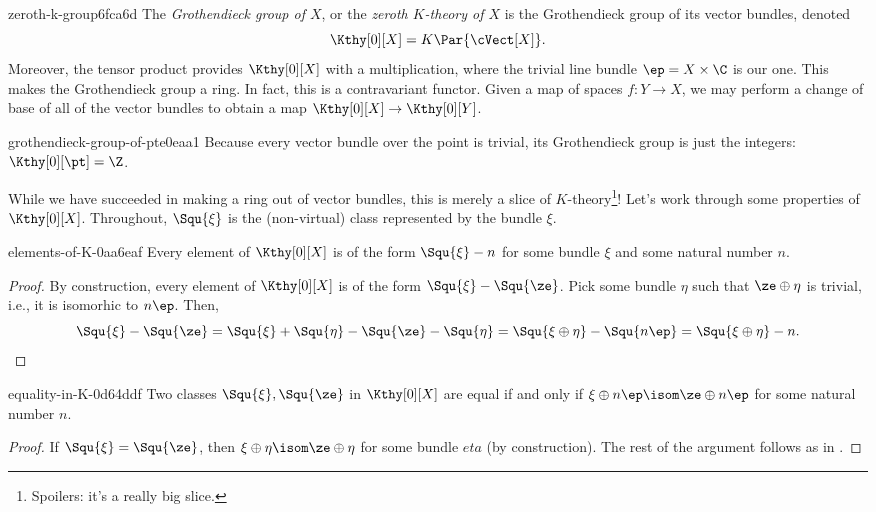 \begin{defn}{zeroth-k-group}{6fca6d}
  The \emph{Grothendieck group of $X$}, or the \emph{zeroth $K$-theory of $X$} is the
  Grothendieck group of its vector bundles, denoted 
  \[ \Kthy[0][X] = K\Par{\cVect[X]}. \] 
  Moreover, the tensor product provides $\Kthy[0][X]$ with a multiplication, where the
  trivial line bundle $\ep = X \times \C$ is our one. This makes the Grothendieck group a ring.
  In fact, this is a contravariant functor. Given a map of spaces $f: Y \to X$, we may perform
  a change of base of all of the vector bundles to obtain a map $\Kthy[0][X] \to \Kthy[0][Y]$.
\end{defn}

\begin{exmp}{grothendieck-group-of-pt}{e0eaa1}
  Because every vector bundle over the point is trivial, its Grothendieck group is just the
  integers: $\Kthy[0][\pt] = \Z$.
\end{exmp}

While we have succeeded in making a ring out of vector bundles, this is merely a 
slice of $K$-theory\footnote{Spoilers: it's a really big slice.}! Let's work through some
properties of $\Kthy[0][X]$. Throughout, $\Squ{\xi}$ is the (non-virtual) class represented
by the bundle $\xi$.

\begin{prop}{elements-of-K-0}{aa6eaf}
  Every element of $\Kthy[0][X]$ is of the form $\Squ{\xi} - n$ for some bundle $\xi$ and
  some natural number $n$.
\end{prop}
\begin{proof}
  By construction, 
  every element of $\Kthy[0][X]$ is of the form $\Squ{\xi} - \Squ{\ze}$. Pick some 
  bundle $\eta$ such that $\ze \oplus \eta$ is trivial, i.e., it is isomorhic to $n\ep$. 
  Then,
  \[ \Squ{\xi} - \Squ{\ze} = \Squ{\xi} + \Squ{\eta} - \Squ{\ze} - \Squ{\eta} = 
      \Squ{\xi \oplus \eta} - \Squ{n\ep} = \Squ{\xi \oplus \eta} - n. \] 
\end{proof}

\begin{prop}{equality-in-K-0}{d64ddf}
  Two classes $\Squ{\xi}, \Squ{\ze}$ in $\Kthy[0][X]$ are equal if and only if
  $\xi \oplus n\ep \isom \ze \oplus n\ep$ for some natural number $n$.
\end{prop}
\begin{proof}
  If $\Squ{\xi} = \Squ{\ze}$, then $\xi \oplus \eta \isom \ze \oplus \eta$ for some bundle
  $eta$ (by construction). The rest of the argument follows as in .
\end{proof}

